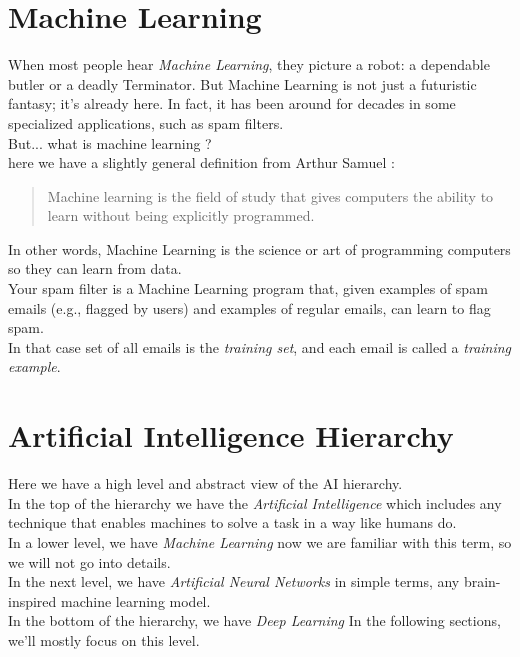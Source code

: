 \documentclass{SBCbookchapter}
\begin{document}
\section*{Machine Learning}
When most people hear \emph{Machine Learning}, they picture a robot: a dependable butler or a deadly Terminator.
But Machine Learning is not just a futuristic fantasy;
it’s already here. In fact, it has been around for decades 
in some specialized applications, such as spam filters. \\
But... what is machine learning ? \\
here we have a slightly general definition from Arthur Samuel :
\begin{quote}
Machine learning is the field of study that gives computers the ability to learn without being explicitly programmed.
\end{quote}
In other words, Machine Learning is the science or art of programming computers so they can learn from data.\\
Your spam filter is a Machine Learning
program that, given examples of spam
emails (e.g., flagged by users) and examples of regular emails,
can learn to flag spam.\\
In that case set of all emails is the \textit{training set}, and each email is called a \textit{training example}.

\section*{Artificial Intelligence Hierarchy}
Here we have a high level and abstract view of the AI hierarchy.\\
In the top of the hierarchy we have the \textit{Artificial Intelligence}
which includes any technique that enables machines to solve a task in a
way like humans do.\\
In a lower level, we have \textit{Machine Learning}
now we are familiar with this term, so we will not go into details.\\
In the next level, we have \textit{Artificial Neural Networks}
in simple terms, any brain-inspired machine learning model. \\
In the bottom of the hierarchy, we have \textit{Deep Learning}
In the following sections, we'll mostly focus on this level.
\end{document}
